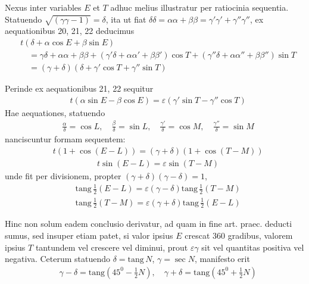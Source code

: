 Nexus inter variables $E$ et $T$ adhuc melius illustratur per ratiocinia sequentia.
Statuendo $\surd{(\gamma\gamma-1)}=\delta$, ita ut fiat $\delta\delta=\alpha\alpha+\beta\beta=\gamma'\gamma'+\gamma''\gamma''$, ex
aequationibus 20, 21, 22 deducimus
\[
\begin{aligned}
&t(\delta+\alpha\cos E+\beta\sin E)\\[8pt]
&\quad=\gamma\delta+\alpha\alpha+\beta\beta
+(\gamma'\delta+\alpha\alpha'+\beta\beta')\cos T
+(\gamma''\delta+\alpha\alpha''+\beta\beta'')\sin T\\[8pt]
&\quad=(\gamma+\delta)(\delta+\gamma'\cos T+\gamma''\sin T)
\end{aligned}
\]
\par Perinde ex aequationibus 21, 22 sequitur
\[
\begin{aligned}
&t(\alpha\sin E-\beta\cos E)=\varepsilon(\gamma'\sin T-\gamma''\cos T)
\end{aligned}
\]
Hae aequationes, statuendo
\[
\begin{aligned}
&\frac{\alpha}{\delta}=\cos L,\quad
\frac{\beta}{\delta}=\sin L,\quad
\frac{\gamma'}{\delta}=\cos M,\quad
\frac{\gamma''}{\delta}=\sin M
\end{aligned}
\]
nanciscuntur formam sequentem:
\[
\begin{aligned}
&t(1+\cos(E-L))=(\gamma+\delta)(1+\cos(T-M))
\end{aligned}
\]
\[
\begin{aligned}
&t\sin(E-L)=\varepsilon\sin(T-M)
\end{aligned}
\]
unde fit per divisionem, propter $(\gamma+\delta)(\gamma-\delta)=1$,
\[
\begin{aligned}
&\mathrm{tang}\,\frac12(E-L)=\varepsilon(\gamma-\delta)\mathrm{tang}\,\frac12(T-M)
\end{aligned}
\]
\[
\begin{aligned}
&\mathrm{tang}\,\frac12(T-M)=\varepsilon(\gamma+\delta)\mathrm{tang}\,\frac12(E-L)
\end{aligned}
\]
\par Hinc non solum eadem conclusio derivatur, ad quam in fine art. praec. deducti
sumus, sed insuper etiam patet, si valor ipsius $E$ crescat 360 gradibus, valorem
ipsius $T$ tantundem vel crescere vel diminui, prout $\varepsilon\gamma$ sit vel quantitas
positiva vel negativa. Ceterum statuendo $\delta=\mathrm{tang}\,N$, $\gamma=\sec N$, manifesto erit
\[
\begin{aligned}
&\gamma-\delta=\mathrm{tang}(45^0-\frac12N),\quad
\gamma+\delta=\mathrm{tang}(45^0+\frac12N)
\end{aligned}
\]

